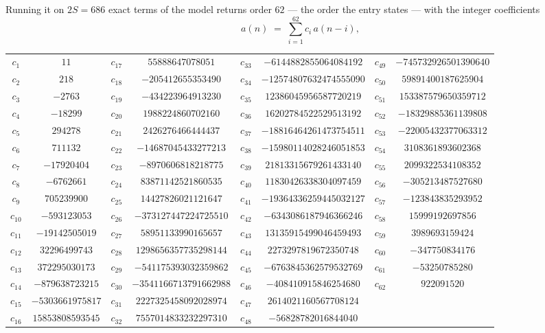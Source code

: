 \documentclass[11pt,a4paper]{article}
\theoremstyle{plain}
\theoremstyle{definition}
\begin{document}
Running it on $2S=686$ exact terms of the model returns order $62$ --- the order the
entry states --- with the integer coefficients
\[
a(n)\;=\;\sum_{i=1}^{62}c_i\,a(n-i),
\]
\begin{center}\small
\begin{tabular}{cccccccc}
$c_{1}$ & $11$ & $c_{17}$ & $55888647078051$ & $c_{33}$ & $-6144882855064084192$ & $c_{49}$ & $-745732926501390640$ \\
$c_{2}$ & $218$ & $c_{18}$ & $-205412655353490$ & $c_{34}$ & $-12574807632474555090$ & $c_{50}$ & $59891400187625904$ \\
$c_{3}$ & $-2763$ & $c_{19}$ & $-434223964913230$ & $c_{35}$ & $12386045956587720219$ & $c_{51}$ & $153387579650359712$ \\
$c_{4}$ & $-18299$ & $c_{20}$ & $1988224860702160$ & $c_{36}$ & $16202784522529513192$ & $c_{52}$ & $-18329885361139808$ \\
$c_{5}$ & $294278$ & $c_{21}$ & $2426276466444437$ & $c_{37}$ & $-18816464261473754511$ & $c_{53}$ & $-22005432377063312$ \\
$c_{6}$ & $711132$ & $c_{22}$ & $-14687045433277213$ & $c_{38}$ & $-15980114028246051853$ & $c_{54}$ & $3108361893602368$ \\
$c_{7}$ & $-17920404$ & $c_{23}$ & $-8970606818218775$ & $c_{39}$ & $21813315679261433140$ & $c_{55}$ & $2099322534108352$ \\
$c_{8}$ & $-6762661$ & $c_{24}$ & $83871142521860535$ & $c_{40}$ & $11830426338304097459$ & $c_{56}$ & $-305213487527680$ \\
$c_{9}$ & $705239900$ & $c_{25}$ & $14427826021121647$ & $c_{41}$ & $-19364336259445032127$ & $c_{57}$ & $-123843835293952$ \\
$c_{10}$ & $-593123053$ & $c_{26}$ & $-373127447224725510$ & $c_{42}$ & $-6343086187946366246$ & $c_{58}$ & $15999192697856$ \\
$c_{11}$ & $-19142505019$ & $c_{27}$ & $58951133990165657$ & $c_{43}$ & $13135915499046459493$ & $c_{59}$ & $3989693159424$ \\
$c_{12}$ & $32296499743$ & $c_{28}$ & $1298656357735298144$ & $c_{44}$ & $2273297819672350748$ & $c_{60}$ & $-347750834176$ \\
$c_{13}$ & $372295030173$ & $c_{29}$ & $-541175393032359862$ & $c_{45}$ & $-6763845362579532769$ & $c_{61}$ & $-53250785280$ \\
$c_{14}$ & $-879638723215$ & $c_{30}$ & $-3541166713791662988$ & $c_{46}$ & $-408410915846254680$ & $c_{62}$ & $922091520$ \\
$c_{15}$ & $-5303661975817$ & $c_{31}$ & $2227325458092028974$ & $c_{47}$ & $2614021160567708124$ &  &  \\
$c_{16}$ & $15853808593545$ & $c_{32}$ & $7557014833232297310$ & $c_{48}$ & $-56828782016844040$ &  &  \\
\end{tabular}
\end{center}
\end{document}
